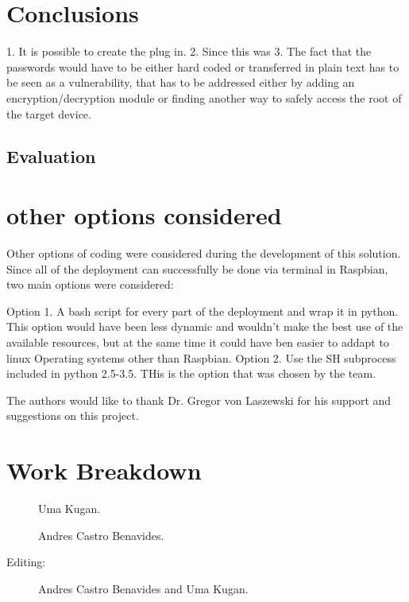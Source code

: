 \documentclass[sigconf]{acmart}
\begin{document}
	
	
	
	\section{Conclusions}
	
	1. It is possible to create the plug in.
	2. Since this was 
	3. The fact that the passwords would have to be either hard coded or transferred in plain text has to be seen as a vulnerability, that has to be addressed either by adding an encryption/decryption module or finding another way to safely access the root of the target device.
	
	\subsection{Evaluation}
	
	
	\section{other options considered}

	Other options of coding were considered during the development of this solution. 	Since all of the deployment can successfully be done via terminal in Raspbian, two main options were considered:
	
	Option 1. A bash script for every part of the deployment and wrap it in python. This option would have been less dynamic and wouldn't make the best use of the available resources, but at the same time it could have ben easier to addapt to linux Operating systems other than Raspbian.
	Option 2. Use the SH subprocess included in python 2.5-3.5. THis is the option that was chosen by the team.
	
	
	\begin{acks}
		The authors would like to thank Dr. Gregor von Laszewski for his support and suggestions on this project.
	\end{acks}
	
	
	
	
	\newpage
	
	\appendix
	
	\section{Work Breakdown}
	
	\begin{description}
		
		\item[] Uma Kugan.
		
		\item[] Andres Castro Benavides.
		
		\item[Editing:] Andres Castro Benavides and Uma Kugan.
		
	\end{description}
	
\end{document}
